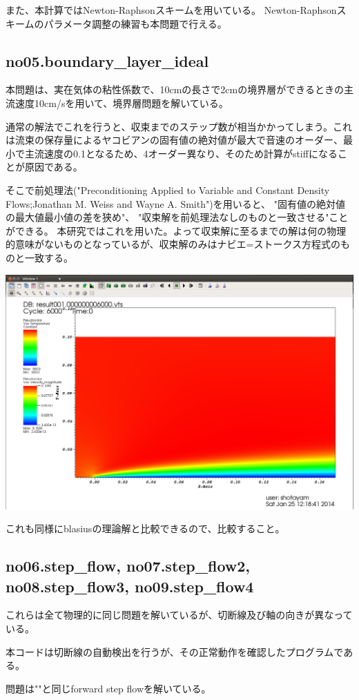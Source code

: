 \documentclass{jsarticle}
\begin{document}
また、本計算ではNewton-Raphsonスキームを用いている。
Newton-Raphsonスキームのパラメータ調整の練習も本問題で行える。
\subsection{no05.boundary\_layer\_ideal}%
本問題は、実在気体の粘性係数で、10cmの長さで2cmの境界層ができるときの主流速度10cm/sを用いて、境界層問題を解いている。

通常の解法でこれを行うと、収束までのステップ数が相当かかってしまう。これは流束の保存量によるヤコビアンの固有値の絶対値が最大で音速のオーダー、最小で主流速度の0.1となるため、4オーダー異なり、そのため計算がstiffになることが原因である。

そこで前処理法("Preconditioning Applied to Variable and Constant Density Flows;Jonathan M. Weiss and Wayne A. Smith")を用いると、
"固有値の絶対値の最大値最小値の差を狭め"、
"収束解を前処理法なしのものと一致させる"ことができる。
本研究ではこれを用いた。よって収束解に至るまでの解は何の物理的意味がないものとなっているが、収束解のみはナビエ=ストークス方程式のものと一致する。
\begin{center}
\includegraphics[width=.8\textwidth,bb=0 0 1569 1059]{sample/no05.png}
\end{center}
これも同様にblasiusの理論解と比較できるので、比較すること。
\subsection{no06.step\_flow, no07.step\_flow2, no08.step\_flow3, no09.step\_flow4}%
これらは全て物理的に同じ問題を解いているが、切断線及び軸の向きが異なっている。

本コードは切断線の自動検出を行うが、その正常動作を確認したプログラムである。

問題は""と同じforward step flowを解いている。
\end{document}
